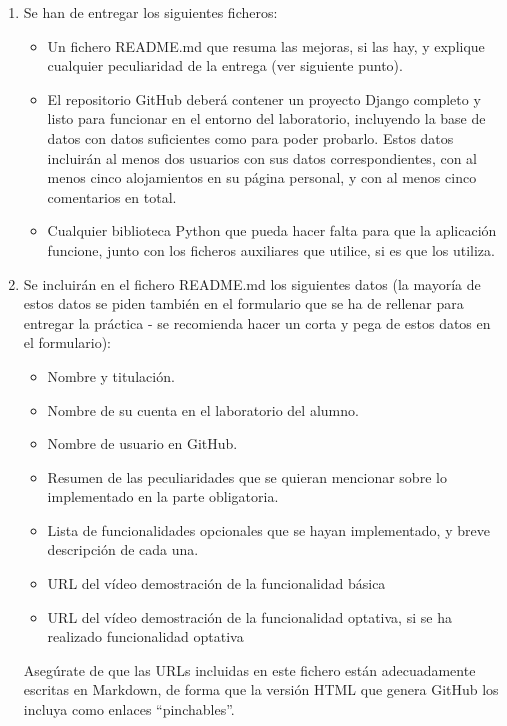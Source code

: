 \begin{enumerate}
  \item Se han de entregar los siguientes ficheros:

\begin{itemize}
  \item Un fichero README.md que resuma las mejoras, si las hay, y explique cualquier peculiaridad de la entrega (ver siguiente punto).
  \item El repositorio GitHub deberá contener un proyecto Django completo y listo para funcionar en el entorno del laboratorio, incluyendo la base de datos con datos suficientes como para poder probarlo. Estos datos incluirán al menos dos usuarios con sus datos correspondientes, con al menos cinco alojamientos en su página personal, y con al menos cinco comentarios en total.
  \item Cualquier biblioteca Python que pueda hacer falta para que la aplicación funcione, junto con los ficheros auxiliares que utilice, si es que los utiliza.
\end{itemize}

  \item Se incluirán en el fichero README.md los siguientes datos (la mayoría de estos datos se piden también en el formulario que se ha de rellenar para entregar la práctica - se recomienda hacer un corta y pega de estos datos en el formulario):

\begin{itemize}
  \item Nombre y titulación.
  \item Nombre de su cuenta en el laboratorio del alumno.
  \item Nombre de usuario en GitHub.
  \item Resumen de las peculiaridades que se quieran mencionar sobre lo implementado en la parte obligatoria.
  \item Lista de funcionalidades opcionales que se hayan implementado, y breve descripción de cada una.
  \item URL del vídeo demostración de la funcionalidad básica
  \item URL del vídeo demostración de la funcionalidad optativa, si se ha realizado funcionalidad optativa
\end{itemize}

Asegúrate de que las URLs incluidas en este fichero están adecuadamente escritas en Markdown, de forma que la versión HTML que genera GitHub los incluya como enlaces ``pinchables''.

\end{enumerate}


